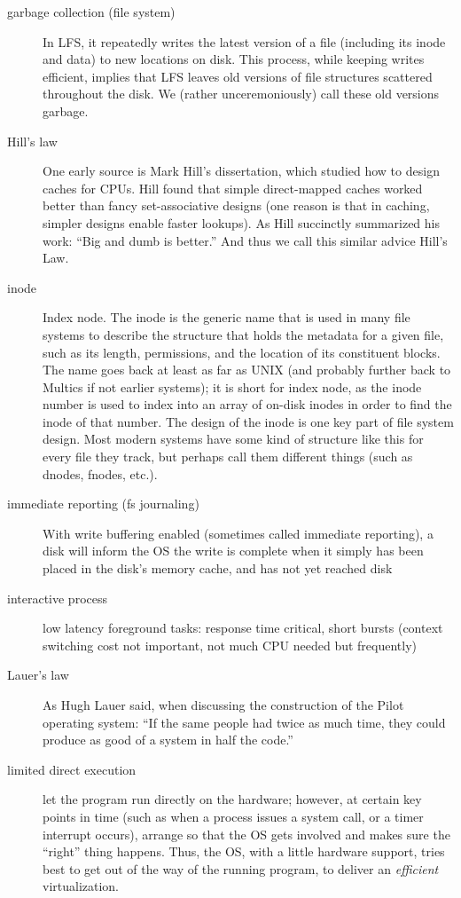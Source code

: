 \begin{description}
\item[garbage collection (file system)] In LFS, it repeatedly writes the latest version of a file (including its inode and data) to new locations on disk. This process, while keeping writes efficient, implies that LFS leaves old versions of file structures scattered throughout the disk. We (rather unceremoniously) call these old versions garbage.

\item[Hill's law] One early source is Mark Hill's dissertation, which studied how to design caches for CPUs. Hill found that simple direct-mapped caches worked better than fancy set-associative designs (one reason is that in caching, simpler designs enable faster lookups). As Hill succinctly summarized
  his work: ``Big and dumb is better.'' And thus we call this similar advice Hill's Law.

\item[inode] Index node. The inode is the generic name that is used in many file systems to describe the structure that holds the metadata for a given file, such as its length, permissions, and the location of its constituent blocks. The name
goes back at least as far as UNIX (and probably further back to Multics if not earlier systems); it is short for index node, as the inode number is used to index into an array of on-disk inodes in order to find the inode of that number. The design of the inode is one key part of file system design. Most modern systems have some kind of structure like this for every file they track, but perhaps call them different things (such as dnodes, fnodes, etc.).

\item[immediate reporting (fs journaling)] With write buffering enabled (sometimes called immediate reporting), a disk will inform the OS the write is complete when it simply has been placed in the disk’s memory cache, and has not yet reached disk

\item[interactive process] low latency foreground tasks: response time critical, short bursts (context switching cost not important, not much CPU needed but frequently)

\item[Lauer's law] As Hugh Lauer said, when discussing the construction of the Pilot operating system: ``If the same people had twice as much time, they could produce as good of a system in half the code.''

\item[limited direct execution] let the program run directly on the hardware; however, at certain key points in time (such as when a process issues a system call, or a timer interrupt occurs), arrange so that the OS gets involved and makes sure the ``right'' thing happens.   Thus, the OS, with a little hardware support, tries best to get out of the way of the running program, to deliver an \emph{efficient} virtualization.


\end{description}

